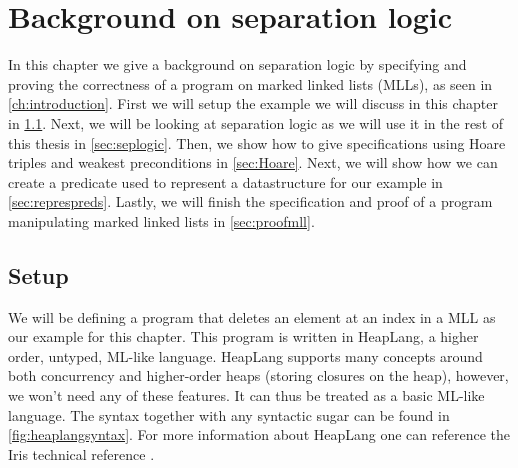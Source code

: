 \documentclass[thesis.tex]{subfiles}
\begin{document}
\chapter{Background on separation logic}

In this chapter we give a background on separation logic by specifying and proving the correctness of a program on marked linked lists (MLLs), as seen in \cref*{ch:introduction}. First we will setup the example we will discuss in this chapter in \cref*{sec:irissetup}. Next, we will be looking at separation logic as we will use it in the rest of this thesis in \cref*{sec:seplogic}. Then, we show how to give specifications using Hoare triples and weakest preconditions in \cref*{sec:Hoare}. Next, we will show how we can create a predicate used to represent a datastructure for our example in \cref*{sec:represpreds}. Lastly, we will finish the specification and proof of a program manipulating marked linked lists in \cref*{sec:proofmll}.

\section{Setup}
\label{sec:irissetup}
We will be defining a program that deletes an element at an index in a MLL as our example for this chapter. This program is written in HeapLang, a higher order, untyped, ML-like language. HeapLang supports many concepts around both concurrency and higher-order heaps (storing closures on the heap), however, we won't need any of these features. It can thus be treated as a basic ML-like language. The syntax together with any syntactic sugar can be found in \cref*{fig:heaplangsyntax}. For more information about HeapLang one can reference the Iris technical reference \cite*{iristeamIrisReference2023}.
\end{document}
